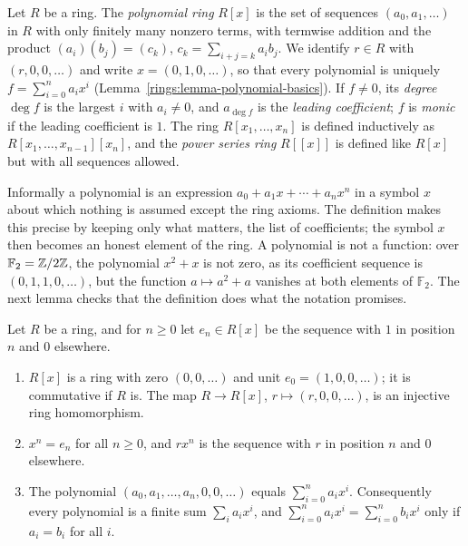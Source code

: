 \begin{definition}\label{rings:definition-polynomials}
Let $R$ be a ring. The \emph{polynomial ring} $R[x]$ is the set of sequences
$(a_0, a_1, \ldots)$ in $R$ with only finitely many nonzero terms, with termwise
addition and the product $(a_i)(b_j) = (c_k)$, $c_k = \sum_{i + j = k} a_i b_j$. We
identify $r \in R$ with $(r, 0, 0, \ldots)$ and write $x = (0, 1, 0, \ldots)$, so that
every polynomial is uniquely $f = \sum_{i=0}^n a_i x^i$ (Lemma~\ref{rings:lemma-polynomial-basics}). If $f \neq 0$, its
\emph{degree} $\deg f$ is the largest $i$ with $a_i \neq 0$, and $a_{\deg f}$ is the
\emph{leading coefficient}; $f$ is \emph{monic} if the leading coefficient is $1$. The
ring $R[x_1, \ldots, x_n]$ is defined inductively as $R[x_1, \ldots, x_{n-1}][x_n]$, and the
\emph{power series ring} $R[[x]]$ is defined like $R[x]$ but with all sequences allowed.
\end{definition}

Informally a polynomial is an expression $a_0 + a_1x + \cdots + a_nx^n$ in a symbol $x$ about which nothing is assumed except the ring axioms. The definition makes this precise by keeping only what
matters, the list of coefficients; the symbol $x$ then becomes an honest element of the ring. A polynomial is not a function: over $\mathbb{F}_2 = \mathbb{Z}/2\mathbb{Z}$, the polynomial $x^2 + x$ is not zero, as its coefficient
sequence is $(0, 1, 1, 0, \ldots)$, but the function $a \mapsto a^2 + a$ vanishes at both elements of $\mathbb{F}_2$. The next lemma checks that the definition does what the notation promises.

\begin{lemma}\label{rings:lemma-polynomial-basics}
Let $R$ be a ring, and for $n \geq 0$ let $e_n \in R[x]$ be the sequence with $1$ in position $n$ and $0$ elsewhere.
\begin{enumerate}
\item $R[x]$ is a ring with zero $(0, 0, \ldots)$ and unit $e_0 = (1, 0, 0, \ldots)$; it is commutative if $R$ is. The map $R \to R[x]$, $r \mapsto (r, 0, 0, \ldots)$, is an injective ring homomorphism.
\item $x^n = e_n$ for all $n \geq 0$, and $r x^n$ is the sequence with $r$ in position $n$ and $0$ elsewhere.
\item The polynomial $(a_0, a_1, \ldots, a_n, 0, 0, \ldots)$ equals $\sum_{i=0}^na_ix^i$. Consequently every polynomial is a finite sum $\sum_ia_ix^i$, and $\sum_{i=0}^na_ix^i = \sum_{i=0}^nb_ix^i$ only if $a_i = b_i$ for all $i$.
\end{enumerate}
\end{lemma}

